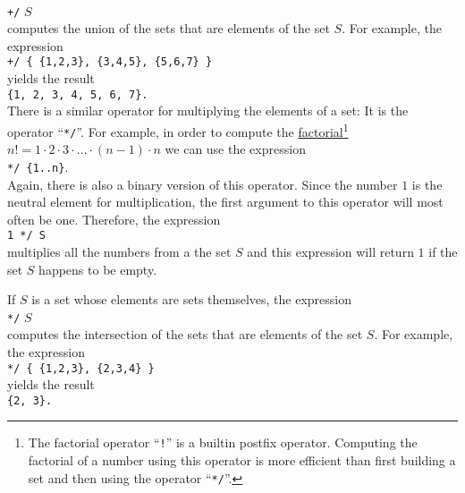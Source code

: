 \\[0.2cm]
\hspace*{1.3cm}
\texttt{+/} $S$
\\[0.2cm]
computes the union of the sets that are elements of the set $S$.  For example, the expression
\\[0.2cm]
\hspace*{1.3cm}
\texttt{+/ \{ \{1,2,3\}, \{3,4,5\}, \{5,6,7\} \}}
\\[0.2cm]
yields the result
\\[0.2cm]
\hspace*{1.3cm}
\texttt{\{1, 2, 3, 4, 5, 6, 7\}.}
\\[0.2cm]
There is a similar operator for multiplying the elements of a set: It is the operator
``\texttt{*/}''.
For example, in order to compute the \href{https://en.wikipedia.org/wiki/Factorial}{factorial\footnote{
  The factorial operator ``\texttt{!}'' is a builtin postfix operator.  Computing
  the factorial of a number using this operator is more efficient than first building a set
  and then using the operator ``\texttt{*/}''.
}}
$n! = 1 \cdot 2 \cdot 3 \cdot {\dots} \cdot (n-1) \cdot n$ we can use the expression
\\[0.2cm]
\hspace*{1.3cm}
\texttt{*/ \{1..n\}}.
\\[0.2cm]
Again, there is also a binary version of this operator.  Since the number $1$ is the
neutral element for  multiplication, the first argument to this operator will most often
be one.   Therefore, the expression
\\[0.2cm]
\hspace*{1.3cm}
\texttt{1 */ S}
\\[0.2cm]
 multiplies all the numbers from a the set $S$ and this expression will return $1$ if the
 set $S$ happens to be empty.  

If $S$ is a set whose elements are sets themselves, the expression
\\[0.2cm]
\hspace*{1.3cm}
\texttt{*/} $S$
\\[0.2cm]
computes the intersection of the sets that are elements of the set $S$.  For example, the expression
\\[0.2cm]
\hspace*{1.3cm}
\texttt{*/ \{ \{1,2,3\}, \{2,3,4\} \}}
\\[0.2cm]
yields the result
\\[0.2cm]
\hspace*{1.3cm}
\texttt{\{2, 3\}.}

